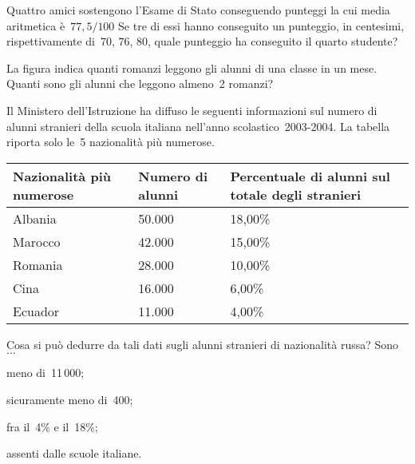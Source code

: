 \begin{multicols}{2}
\begin{esercizio}
\label{ese:A.51}
Quattro amici sostengono l'Esame di Stato conseguendo punteggi la cui media 
aritmetica è~$77,5/100$
Se tre di essi hanno conseguito un punteggio, in centesimi, rispettivamente 
di~70, 76, 80, quale punteggio ha conseguito il quarto studente?
\end{esercizio}

\begin{esercizio}
\label{ese:A.57}
La figura indica quanti romanzi leggono gli alunni di una classe in un 
mese. Quanti sono gli alunni che leggono almeno~2 romanzi?

\begin{center}
 
\end{center}
\end{esercizio}
\end{multicols}

\begin{esercizio}
\label{ese:A.58}
Il Ministero dell'Istruzione ha diffuso le seguenti informazioni sul numero 
di alunni stranieri della scuola italiana
nell'anno scolastico~2003-2004. La tabella riporta solo le~5 nazionalità 
più numerose.
\begin{center}
 \begin{tabularx}{.9\textwidth}{*{3}{X}}
\toprule
Nazionalità più numerose & Numero di alunni & Percentuale di alunni sul 
totale degli stranieri \\
\midrule
Albania & 50.000 & 18,00\% \\
Marocco & 42.000 & 15,00\% \\
Romania & 28.000 & 10,00\% \\
Cina & 16.000 & 6,00\% \\
Ecuador & 11.000 & 4,00\% \\
\bottomrule
\end{tabularx}
\end{center}

Cosa si può dedurre da tali dati sugli alunni stranieri di nazionalità 
russa? Sono~$\ldots$
\begin{multicols}{2}
\begin{enumeratea}
 \item meno di~11\,000;
 \item sicuramente meno di~400;
 \item fra il~4\% e il~18\%;
 \item assenti dalle scuole italiane.
\end{enumeratea}
\end{multicols}
\end{esercizio}

